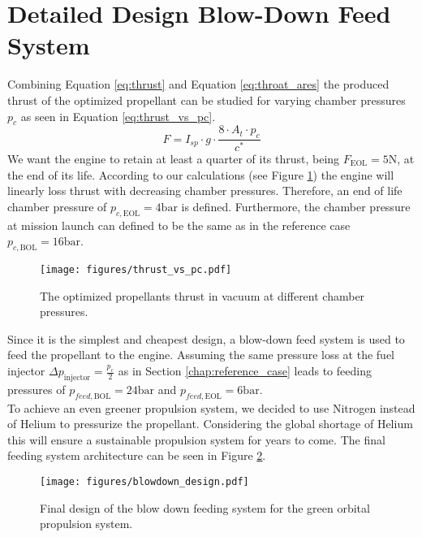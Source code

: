 \documentclass[12pt]{article}
\begin{document}
\section{Detailed Design Blow-Down Feed System}
\label{chap:task_b5}
Combining Equation \ref{eq:thrust} and Equation \ref{eq:throat_ares} the produced thrust of the optimized propellant can be studied for varying chamber pressures $p_c$ as seen in Equation \ref{eq:thrust_vs_pc}.
\begin{equation}
	F = I_{sp} \cdot g \cdot \frac{8 \cdot A_t\cdot p_c}{c^*}
	\label{eq:thrust_vs_pc}
\end{equation}
We want the engine to retain at least a quarter of its thrust, being $F_{\text{EOL}}=5\text{N}$, at the end of its life. According to our calculations (see Figure \ref{fig:thrust_vs_pc}) the engine will linearly loss thrust with decreasing chamber pressures. Therefore, an end of life chamber pressure of $p_{c,\text{EOL}}=4\text{bar}$ is defined. Furthermore, the chamber pressure at mission launch can defined to be the same as in the reference case $p_{c,\text{BOL}}=16\text{bar}$.\\

\begin{figure}[h]
	\centering
	\texttt{[image: figures/thrust\_vs\_pc.pdf]}
	\caption{The optimized propellants thrust in vacuum at different chamber pressures.}
	\label{fig:thrust_vs_pc}
\end{figure}

Since it is the simplest and cheapest design, a blow-down feed system is used to feed the propellant to the engine. Assuming the same pressure loss at the fuel injector $\Delta p_{\text{injector}}= \frac{p_c}{2}$ as in Section \ref{chap:reference_case} leads to feeding pressures of $p_{feed,\text{BOL}}=24\text{bar}$ and $p_{feed,\text{EOL}}=6\text{bar}$.\\

To achieve an even greener propulsion system, we decided to use Nitrogen instead of Helium to pressurize the propellant. Considering the global shortage of Helium this will ensure a sustainable propulsion system for years to come. The final feeding system architecture can be seen in Figure \ref{fig:blowdown_design}.\\

\begin{figure}[h]
	\centering
	\texttt{[image: figures/blowdown\_design.pdf]}
	\caption{Final design of the blow down feeding system for the green orbital propulsion system.}
	\label{fig:blowdown_design}
\end{figure}
\end{document}
